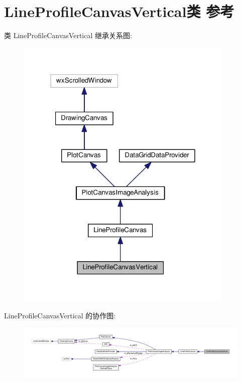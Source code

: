 \hypertarget{class_line_profile_canvas_vertical}{\section{Line\+Profile\+Canvas\+Vertical类 参考}
\label{class_line_profile_canvas_vertical}
}


类 Line\+Profile\+Canvas\+Vertical 继承关系图\+:
\nopagebreak
\begin{figure}[H]
\begin{center}
\leavevmode
\includegraphics[width=295pt]{class_line_profile_canvas_vertical__inherit__graph}
\end{center}
\end{figure}


Line\+Profile\+Canvas\+Vertical 的协作图\+:
\nopagebreak
\begin{figure}[H]
\begin{center}
\leavevmode
\includegraphics[width=350pt]{class_line_profile_canvas_vertical__coll__graph}
\end{center}
\end{figure}

